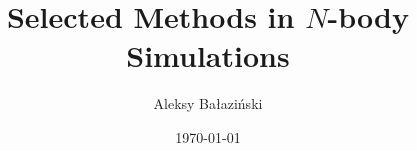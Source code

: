 \documentclass{article}
\title{Selected Methods in $N$-body Simulations}
\author{Aleksy Bałaziński}
\date{\today}
\begin{document}
\newcommand{\PThreeM}{P$^3$M}

\maketitle

\tableofcontents











\end{document}
